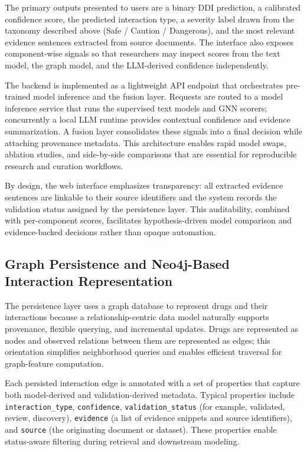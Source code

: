 \documentclass[conference]{Template/IEEEtran}
\begin{document}
The primary outputs presented to users are a binary DDI prediction, a calibrated confidence score, the predicted interaction type, a severity label drawn from the taxonomy described above (Safe / Caution / Dangerous), and the most relevant evidence sentences extracted from source documents. The interface also exposes component-wise signals so that researchers may inspect scores from the text model, the graph model, and the LLM-derived confidence independently.

The backend is implemented as a lightweight API endpoint that orchestrates pre-trained model inference and the fusion layer. Requests are routed to a model inference service that runs the supervised text models and GNN scorers; concurrently a local LLM runtime provides contextual confidence and evidence summarization. A fusion layer consolidates these signals into a final decision while attaching provenance metadata. This architecture enables rapid model swaps, ablation studies, and side-by-side comparisons that are essential for reproducible research and curation workflows.

By design, the web interface emphasizes transparency: all extracted evidence sentences are linkable to their source identifiers and the system records the validation status assigned by the persistence layer. This auditability, combined with per-component scores, facilitates hypothesis-driven model comparison and evidence-backed decisions rather than opaque automation.

\subsection{Graph Persistence and Neo4j-Based Interaction Representation}
The persistence layer uses a graph database to represent drugs and their interactions because a relationship-centric data model naturally supports provenance, flexible querying, and incremental updates. Drugs are represented as nodes and observed relations between them are represented as edges; this orientation simplifies neighborhood queries and enables efficient traversal for graph-feature computation.

Each persisted interaction edge is annotated with a set of properties that capture both model-derived and validation-derived metadata. Typical properties include \texttt{interaction\_type}, \texttt{confidence}, \texttt{validation\_status} (for example, validated, review, discovery), \texttt{evidence} (a list of evidence snippets and source identifiers), and \texttt{source} (the originating document or dataset). These properties enable status-aware filtering during retrieval and downstream modeling.
\end{document}
